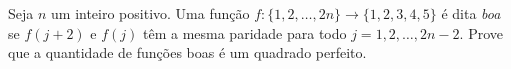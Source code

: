 Seja $n$ um inteiro positivo. Uma função $f : \{1, 2, \dots, 2n\} \to \{1, 2, 3, 4, 5\}$ é
dita \textit{boa} se $f(j+2)$ e $f(j)$ têm a mesma paridade para todo $j = 1, 2, \dots, 2n-2$.
Prove que a quantidade de funções boas é um quadrado perfeito.